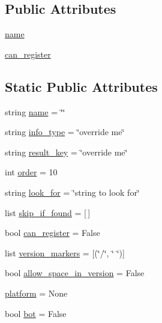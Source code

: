 \subsection*{Public Attributes}
\begin{DoxyCompactItemize}
\item 
\hyperlink{classhttpagentparser_1_1_detector_base_a7895d7f0a2aae86cb5381e74cb1a413e}{name}
\item 
\hyperlink{classhttpagentparser_1_1_detector_base_a5b6f87414a82c136adf833031f013593}{can\+\_\+register}
\end{DoxyCompactItemize}
\subsection*{Static Public Attributes}
\begin{DoxyCompactItemize}
\item 
string \hyperlink{classhttpagentparser_1_1_detector_base_ab5f0a41981b98396b593d44a981a77bc}{name} = \char`\"{}\char`\"{}
\item 
string \hyperlink{classhttpagentparser_1_1_detector_base_a46d36e7cd15f3d1208548ba393826a22}{info\+\_\+type} = \char`\"{}override me\char`\"{}
\item 
string \hyperlink{classhttpagentparser_1_1_detector_base_a57798e45a12c271cb5de4a1ee64a5b7e}{result\+\_\+key} = \char`\"{}override me\char`\"{}
\item 
int \hyperlink{classhttpagentparser_1_1_detector_base_a92853159921546e362d2b1bd08856d04}{order} = 10
\item 
string \hyperlink{classhttpagentparser_1_1_detector_base_a4587aa94d3e88cc0514265d11cc1ea40}{look\+\_\+for} = \char`\"{}string to look for\char`\"{}
\item 
list \hyperlink{classhttpagentparser_1_1_detector_base_afcd60add7ac675edd91e88556324beb5}{skip\+\_\+if\+\_\+found} = \mbox{[}$\,$\mbox{]}
\item 
bool \hyperlink{classhttpagentparser_1_1_detector_base_a1d3e4527904af7d8f4ddb31b7a4d13ce}{can\+\_\+register} = False
\item 
list \hyperlink{classhttpagentparser_1_1_detector_base_a224d3758620f1ad7fe4eb01d93f871ae}{version\+\_\+markers} = \mbox{[}(\char`\"{}/\char`\"{}, \char`\"{} \char`\"{})\mbox{]}
\item 
bool \hyperlink{classhttpagentparser_1_1_detector_base_a6e4db0b56bf17e62aa020691b3ed50c2}{allow\+\_\+space\+\_\+in\+\_\+version} = False
\item 
\hyperlink{classhttpagentparser_1_1_detector_base_a840ab673244412b0322624cfb778efad}{platform} = None
\item 
bool \hyperlink{classhttpagentparser_1_1_detector_base_a4bf468cc9b57354739b6c3dab7d24ef8}{bot} = False
\end{DoxyCompactItemize}



